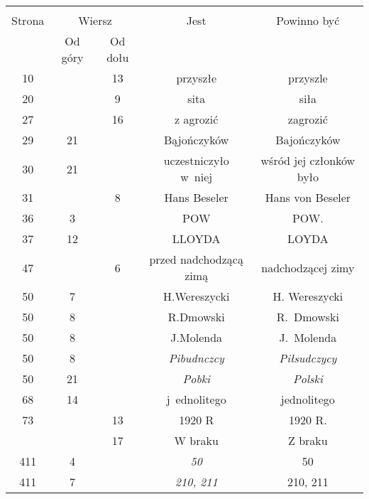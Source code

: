 \documentclass[a4paper,11pt]{article}
\begin{document}
\begin{center}

  \begin{tabular}{|c|c|c|c|c|}
    \hline
    & \multicolumn{2}{c|}{} & & \\
    Strona & \multicolumn{2}{c|}{Wiersz} & Jest
                              & Powinno być \\ \cline{2-3}
    & Od góry & Od dołu & & \\
    \hline
    10  & & 13 & przyszłe & przyszle \\
    20  & &  9 & sita & siła \\
    27  & & 16 & z agrozić & zagrozić \\
    29  & 21 & & Bąjończyków & Bajończyków \\
    30  & 21 & & uczestniczyło w~niej & wśród jej członków było \\
    31  & &  8 & Hans Beseler & Hans von Beseler \\
    36  &  3 & & POW & POW. \\
    37  & 12 & & LLOYDA & LOYDA \\
    47 & & 6 & przed nadchodzącą zimą & nadchodzącej zimy \\
    50  &  7 & & H.Wereszycki & H. Wereszycki \\
    50  &  8 & & R.Dmowski & R.~Dmowski \\
    50  &  8 & & J.Molenda & J.~Molenda \\
    50  &  8 & & \textit{Pibudnczcy} & \textit{Piłsudczycy} \\
    50  & 21 & & \textit{Pobki} & \textit{Polski} \\
    68  & 14 & & j~ednolitego & jednolitego \\
    73  & & 13 & 1920 R & 1920 R. \\
    & & 17 & W braku & Z braku \\
    411 &  4 & & \textit{50} & 50 \\
    411 &  7 & & \textit{210, 211} & 210, 211 \\

\end{tabular}
\end{center}
\end{document}
